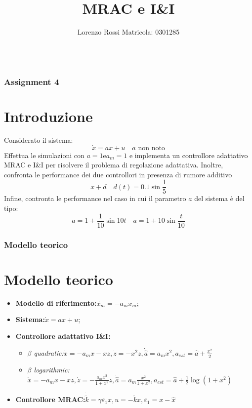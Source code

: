 \documentclass{beamer}
\title[Assignments 4]{MRAC e I\&I}
\author{Lorenzo Rossi Matricola: 0301285}
\begin{document}
\begin{frame}
	\titlepage{}
\end{frame}
\begin{frame}
	\begin{columns}[t]
		\begin{column}{.5\textwidth}
			\tableofcontents[sections={1-3}] %
		\end{column}
		\hspace{-1cm}
		\begin{column}{.5\textwidth}
			\tableofcontents[sections={4-5}] %
		\end{column}
	\end{columns}
\end{frame}
\begin{frame}
	\frametitle{Assignment 4}
	\section{Introduzione}
	Considerato il sistema:\begin{equation*}
		\dot{x}=ax+u\quad a\text{ non noto}
	\end{equation*}
	Effettua le simulazioni con \(a=1 \text{e} a_{m}=1\) e implementa un controllore adattativo MRAC e I\&I per risolvere il problema di regolazione adattativa. Inoltre, confronta le performance dei due controllori in presenza di rumore additivo \begin{equation*}
		x+d\quad d(t) = 0.1 \sin{\frac{1}{5}}
	\end{equation*}
	Infine, contronta le performance nel caso in cui il parametro \(a\) del sistema è del tipo:
	\begin{equation*}
		a=1+\frac{1}{10}\sin{10t}\quad a=1+10\sin{\frac{t}{10}}
	\end{equation*}
\end{frame}
\begin{frame}
	\frametitle{Modello teorico}
	\section{Modello teorico}
	\begin{itemize}
		\item \textbf{Modello di riferimento:}\(\dot{x_{m}}=-a_{m}x_{m}\);
		\item \textbf{Sistema:}\(\dot{x}=ax+u\);
		\item \textbf{Controllore adattativo I\&I:}\begin{itemize}
			      \item \emph{\(\beta \) quadratic:}\(\dot{x}=-a_{m}x-xz,\dot{z}=-x^{2}z,\dot{\hat{a}}=a_{m}x^{2},a_{est}=\hat{a}+\frac{x^{2}}{2}\)
			      \item \emph{\(\beta \) logarithmic:}\(\dot{x}=-a_{m}x-xz,\dot{z}=-\frac{a_{m}x^{2}}{1+x^{2}}z,\dot{\hat{a}}=a_{m}\frac{x^{2}}{1+x^{2}},a_{est}=\hat{a}+\frac{1}{2}\log{(1+x^{2})}\)
		      \end{itemize}
		\item \textbf{Controllore MRAC:}\(\dot{\tilde{k}}=\gamma \varepsilon_{1}x,u=-\tilde{k}x,\varepsilon_{1}=x-\hat{x}\)
	\end{itemize}
\end{frame}
\end{document}
